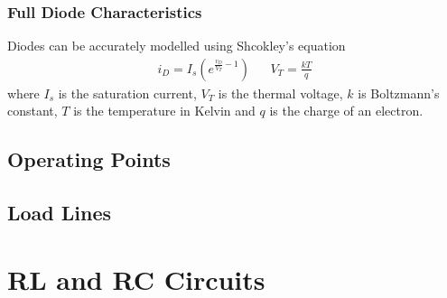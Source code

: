 \documentclass[oneside]{book}
\begin{document}
                \subsection{Full Diode Characteristics}
                    Diodes can be accurately modelled using Shcokley's equation
                    \begin{align*}
                        i_D = I_s \left( e^{\frac{v_D}{V_T} -1} \right) && V_T = \frac{kT}{q}
                    \end{align*}
                    where $I_s$ is the saturation current, $V_T$ is the thermal voltage, $k$ is Boltzmann's constant, $T$ is the temperature in Kelvin and $q$ is the charge of an electron.
            \section{Operating Points}
            \section{Load Lines}
        \chapter{RL and RC Circuits}
\end{document}

